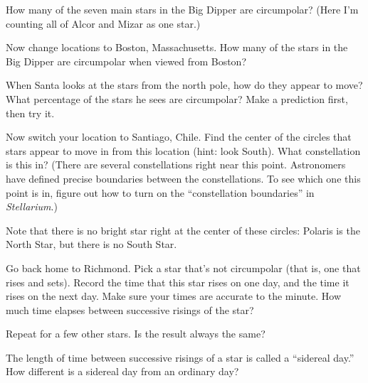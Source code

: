 How many of the seven main stars in the
Big Dipper are circumpolar? (Here I'm counting all of
Alcor and Mizar as one star.)


\answerspace{.75in}

Now change locations to Boston, Massachusetts.  How many of the stars
in the Big Dipper are circumpolar when viewed from Boston?

\answerspace{.75in}

When Santa looks at the stars from the north pole, how do they
appear to move?  What percentage of the stars he sees are circumpolar?
Make a prediction first, then try it.

\answerspace{.75in}

\pagebreak[2]
Now switch your location to Santiago, Chile.  Find the center of the
circles that stars appear to move in from this location (hint: look South).
What constellation is this in? (There are several constellations right near
this point. Astronomers have defined precise boundaries between the
constellations. To see which one this point is in, figure out how to turn
on the ``constellation boundaries'' in \textit{Stellarium}.)

\answerspace{1in}

Note that there is no bright star right at the center of these circles:
Polaris is the North Star, but there is no South Star.

Go back home to Richmond.
Pick a star that's not circumpolar (that is, one that rises and sets).
Record the time that this star rises on one day, and the time it
rises on the next day.  Make sure your times are accurate to the minute.
How much time elapses between successive risings of the star?

\answerspace{1in}

Repeat for a few other stars.  Is the result always the same?

\answerspace{1in}


The length of time between successive risings of a star is called a
``sidereal day.''  How different is a sidereal day from an ordinary
day?

